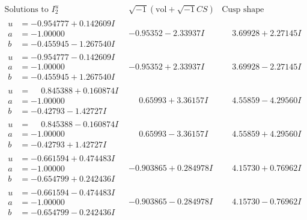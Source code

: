 \documentclass[1p]{elsarticle_modified}
\theoremstyle{definition}
\newcommand{\I}{\sqrt{-1}}
\begin{document}
$$\begin{array}{c|c|c}  
\text{Solutions to }I^u_{2}& \I (\text{vol} + \sqrt{-1}CS) & \text{Cusp shape}\\
 \hline 
\begin{aligned}
u &= -0.954777 + 0.142609 I \\
a &= -1.00000\phantom{ +0.000000I} \\
b &= -0.455945 - 1.267540 I\end{aligned}
 & -0.95352 - 2.33937 I & \phantom{-}3.69928 + 2.27145 I \\ \hline\begin{aligned}
u &= -0.954777 - 0.142609 I \\
a &= -1.00000\phantom{ +0.000000I} \\
b &= -0.455945 + 1.267540 I\end{aligned}
 & -0.95352 + 2.33937 I & \phantom{-}3.69928 - 2.27145 I \\ \hline\begin{aligned}
u &= \phantom{-}0.845388 + 0.160874 I \\
a &= -1.00000\phantom{ +0.000000I} \\
b &= -0.42793 - 1.42727 I\end{aligned}
 & \phantom{-}0.65993 + 3.36157 I & \phantom{-}4.55859 - 4.29560 I \\ \hline\begin{aligned}
u &= \phantom{-}0.845388 - 0.160874 I \\
a &= -1.00000\phantom{ +0.000000I} \\
b &= -0.42793 + 1.42727 I\end{aligned}
 & \phantom{-}0.65993 - 3.36157 I & \phantom{-}4.55859 + 4.29560 I \\ \hline\begin{aligned}
u &= -0.661594 + 0.474483 I \\
a &= -1.00000\phantom{ +0.000000I} \\
b &= -0.654799 + 0.242436 I\end{aligned}
 & -0.903865 + 0.284978 I & \phantom{-}4.15730 + 0.76962 I \\ \hline\begin{aligned}
u &= -0.661594 - 0.474483 I \\
a &= -1.00000\phantom{ +0.000000I} \\
b &= -0.654799 - 0.242436 I\end{aligned}
 & -0.903865 - 0.284978 I & \phantom{-}4.15730 - 0.76962 I \\ \hline\begin{aligned}

\end{aligned}
\end{array}$$
\end{document}
